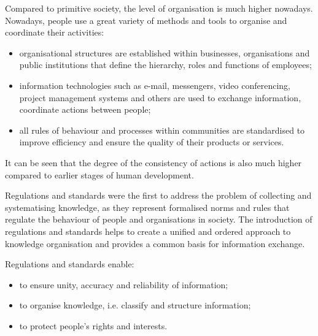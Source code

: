 \documentclass[a4paper]{article}
\begin{document}
\begin{multicols}{2}
{\fontsize{9.6}{13}\selectfont Compared to primitive society, the level of organisation is much higher nowadays. Nowadays, people use
a great variety of methods and tools to organise and
coordinate their activities:
\par}

\begin{itemize}[leftmargin=5mm]
        
        \item organisational structures are established within businesses, organisations and public institutions that define the hierarchy, roles and functions of employees;
        \item information technologies such as e-mail, messengers, video conferencing, project management systems and others are used to exchange information,
coordinate actions between people;
        \item all rules of behaviour and processes within communities are standardised to improve efficiency and
ensure the quality of their products or services.
    
\end{itemize}

{\fontsize{9.5}{13}\selectfont It can be seen that the degree of the consistency of
actions is also much higher compared to earlier stages of
human development.}

{\fontsize{9.5}{13}\selectfont Regulations and standards were the first to address the
problem of collecting and systematising knowledge, as
they represent formalised norms and rules that regulate
the behaviour of people and organisations in society. The
introduction of regulations and standards helps to create a
unified and ordered approach to knowledge organisation
and provides a common basis for information exchange.}

{\fontsize{9.5}{13}\selectfont Regulations and standards enable:}

\begin{itemize}[leftmargin=5mm]
        
        \item to ensure unity, accuracy and reliability of information;

        \item to organise knowledge, i.e. classify and structure
information;

        \item to protect people’s rights and interests.
    
\end{itemize}


\end{multicols}
\end{document}
